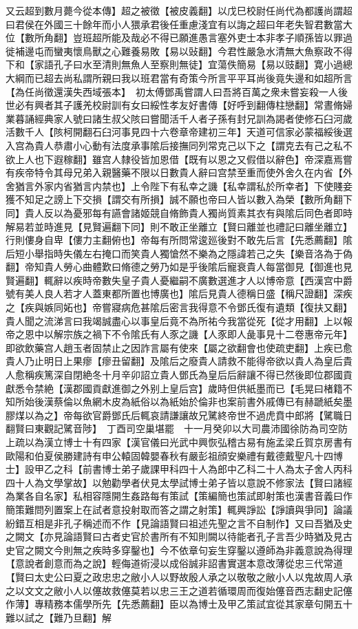 又云超到數月薨今從本傳】超之被徵【被皮義翻】以戊巳校尉任尚代為都護尚謂超曰君侯在外國三十餘年而小人猥承君後任重慮淺宜有以誨之超曰年老失智君數當大位【數所角翻】豈班超所能及哉必不得已願進愚言塞外吏士本非孝子順孫皆以罪過徙補邊屯而蠻夷懷鳥獸之心難養易敗【易以䜴翻】今君性嚴急水清無大魚察政不得下和【家語孔子曰水至清則無魚人至察則無徒】宜蕩佚簡易【易以豉翻】寛小過總大綱而已超去尚私謂所親曰我以班君當有奇策今所言平平耳尚後竟失邊和如超所言【為任尚徵還漢失西域張本】　初太傅鄧禹嘗謂人曰吾將百萬之衆未嘗妄殺一人後世必有興者其子護羌校尉訓有女曰綏性孝友好書傳【好呼到翻傳柱戀翻】常晝脩婦業暮誦經典家人號曰諸生叔父陔曰嘗聞活千人者子孫有封兄訓為謁者使修石臼河歲活數千人【陔柯開翻石臼河事見四十六卷章帝建初三年】天道可信家必蒙福綏後選入宫為貴人恭肅小心動有法度承事隂后接撫同列常克己以下之【謂克去有己之私不欲上人也下遐稼翻】雖宫人隸役皆加恩借【既有以恩之又假借以辭色】帝深嘉焉嘗有疾帝特令其母兄弟入親醫藥不限以日數貴人辭曰宫禁至重而使外舍久在内省【外舍猶言外家内省猶言内禁也】上令陛下有私幸之譏【私幸謂私於所幸者】下使賤妾獲不知足之謗上下交損【謂交有所損】誠不願也帝曰人皆以數入為榮【數所角翻下同】貴人反以為憂邪每有讌會諸姬競自脩飾貴人獨尚質素其衣有與隂后同色者即時解易若並時進見【見賢遍翻下同】則不敢正坐離立【賢曰離並也禮記曰離坐離立】行則僂身自卑【僂力主翻俯也】帝每有所問常逡廵後對不敢先后言【先悉薦翻】隂后短小舉指時失儀左右掩口而笑貴人獨愴然不樂為之隱諱若己之失【樂音洛為于偽翻】帝知貴人勞心曲體歎曰脩德之勞乃如是乎後隂后寵衰貴人每當御見【御進也見賢遍翻】輒辭以疾時帝數失皇子貴人憂繼嗣不廣數選進才人以博帝意【西漢宫中爵號有美人良人若才人蓋東都所置也博廣也】隂后見貴人德稱日盛【稱尺證翻】深疾之【疾與嫉同妬也】帝嘗寢病危甚隂后密言我得意不令鄧氏復有遺類【復扶又翻】貴人聞之流涕言曰我竭誠盡心以事皇后竟不為所祐今我當從死【從才用翻】上以報帝之恩中以解宗族之禍下不令隂氏有人豕之譏【人豕即人彘事見十二卷惠帝元年】即欲飲藥宫人趙玉者固禁止之因詐言屬有使來【屬之欲翻會也使疏吏翻】上疾已愈貴人乃止明日上果瘳【瘳丑留翻】及隂后之廢貴人請救不能得帝欲以貴人為皇后貴人愈稱疾篤深自閉絶冬十月辛卯詔立貴人鄧氏為皇后后辭讓不得已然後即位郡國貢獻悉令禁絶【漢郡國貢獻進御之外别上皇后宫】歲時但供紙墨而已【毛晃曰楮籍不知所始後漢蔡倫以魚網木皮為紙俗以為紙始於倫非也案前書外戚傳已有赫蹏紙矣墨膠煤以為之】帝每欲官爵鄧氏后輒哀請謙讓故兄騭終帝世不過虎賁中郎將【騭職日翻賢曰東觀記騭音陟】　丁酉司空巢堪罷　十一月癸卯以大司農沛國徐防為司空防上疏以為漢立博士十有四家【漢官儀曰光武中興恢弘稽古易有施孟梁丘賀京房書有歐陽和伯夏侯勝建詩有申公轅固韓嬰春秋有嚴彭祖顔安樂禮有戴德戴聖凡十四博士】設甲乙之科【前書博士弟子歲課甲科四十人為郎中乙科二十人為太子舍人丙科四十人為文學掌故】以勉勸學者伏見太學試博士弟子皆以意說不修家法【賢曰諸經為業各自名家】私相容隱開生姦路每有策試【策編簡也策試即射策也漢書音義曰作簡策難問列置案上在試者意投射取而答之謂之射策】輒興諍訟【諍讀與爭同】論議紛錯互相是非孔子稱述而不作【見論語賢曰祖述先聖之言不自制作】又曰吾猶及史之闕文【亦見論語賢曰古者史官於書所有不知則闕以待能者孔子言吾少時猶及見古史官之闕文今則無之疾時多穿鑿也】今不依章句妄生穿鑿以遵師為非義意說為得理【意說者創意而為之說】輕侮道術浸以成俗誠非詔書實選本意改薄從忠三代常道【賢曰太史公曰夏之政忠忠之敝小人以野故殷人承之以敬敬之敝小人以鬼故周人承之以文文之敝小人以僿故救僿莫若以忠三王之道若循環周而復始僿音西志翻史記僿作薄】專精務本儒學所先【先悉薦翻】臣以為博士及甲乙策試宜從其家章句開五十難以試之【難乃旦翻】解